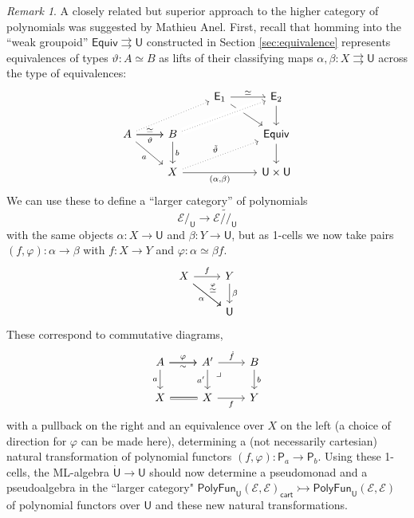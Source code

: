 \documentclass[12pt,reqno]{amsart}
\newcommand{\EE}{\ensuremath{\mathcal{E}}}
\newcommand{\alg}[1]{\ensuremath{\mathsf{#1}}}
\newcommand{\mono}{\ensuremath{\rightarrowtail}}
\renewcommand{\to}{\ensuremath{\rightarrow}}
\newcommand{\tto}{\ensuremath{\rightrightarrows}}
\newcommand{\T}{\ensuremath{\mathsf{U}}}
\newcommand{\TT}{\ensuremath{\dot{\mathsf{U}}}}
\newcommand{\pbcorner}{\arrow[dr,phantom,"\lrcorner" very near start, shift right=.5ex]} %
\theoremstyle{remark}
\newtheorem{remark}[theorem]{Remark}
\theoremstyle{definition}
\begin{document}
\begin{remark}\label{remark:Anel}
A closely related but superior approach to the higher category of polynomials was suggested by Mathieu Anel. First, recall that homming into the ``weak groupoid'' $\mathsf{Equiv} \tto \T$ constructed in Section \ref{sec:equivalence} represents equivalences of types $\vartheta : A \simeq B$ as lifts of their classifying maps $\alpha, \beta : X \tto \T$ across the type of equivalences:
\begin{equation}\label{diag:equivdef2}
\begin{tikzcd} 
	&& \mathsf{E}_1 \ar[rd]  \ar[r,"{\simeq}"]  & \mathsf{E}_2 \ar[d] \\  
A \ar[rd,swap, "a"] \ar[r,swap, "{\vartheta}"]  \ar[r, "{\simeq}"]  \ar[rru, dotted] & B \ar[d, "b"] \ar[rru, crossing over, dotted] && \mathsf{Equiv} \ar[d] \\  
& X \ar[rru, dotted, "{\tilde{\vartheta}}"] \ar[rr, swap, "{(\alpha, \beta)}"] && \T \times \T
	 \end{tikzcd}
 \end{equation}
We can use these to define a ``larger category'' of polynomials $$\EE/_\T \to \EE\widetilde{/\!/}_\T$$ with the same objects $\alpha: X \to \T$ and $\beta : Y\to \T$, but as 1-cells we now take pairs $(f, \varphi) : \alpha \to \beta$ with $f : X \to Y$ and $\varphi : \alpha \simeq \beta f$.
\begin{equation}\label{diag:new1cells}
\begin{tikzcd}
X \ar[r,swap,swap, "{f}"] \ar[rd,swap, "\alpha"] \ar[dr, "{\stackrel{\varphi}{\simeq}}"]&  Y \ar[d, "\beta"] \\
& \T
\end{tikzcd}
\end{equation}
These correspond to commutative diagrams,
\begin{equation}\label{diag:new1cells2}
\begin{tikzcd}
 A \ar[r, "{\varphi}"] \ar[r,swap, "{\sim}"] \ar[d,swap, "a"] & A' \ar[d, swap, "a'"]  \ar[r, "{\dot{f}}"]   \pbcorner & B \ar[d, "b"] \\  
 X \ar[r, equals] & X \ar[r,swap, "{f}"] &  Y
 \end{tikzcd}
 \end{equation}
 with a pullback on the right and an equivalence over $X$ on the left (a choice of direction for $\varphi$ can be made here),
determining a (not necessarily cartesian) natural transformation of polynomial functors $(f, \varphi) : \alg{P}_a \to \alg{P}_b$.  Using these 1-cells, the ML-algebra $\TT\to\T$ should now determine a pseudomonad and a pseudoalgebra in the ``larger category" $\mathsf{PolyFun}_\T(\EE, \EE)_\mathsf{cart} \mono \mathsf{PolyFun}_\T(\EE, \EE)$ of polynomial functors over $\T$ and these new natural transformations.


\end{remark}
\end{document}
